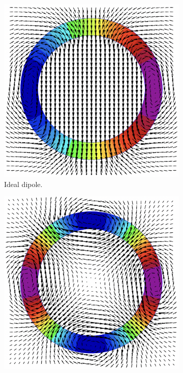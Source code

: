 \begin{figure}[!hbt]
    \begin{center}
    \begin{subfigure}[b]{0.45\textwidth}
        \begin{center}
        \includegraphics[width=\textwidth]{Figures/Beam_Dynamics_Theory/ideal_dipole_cos_theta.png}
        \caption{Ideal dipole.}
        \label{fig:ideal_dipole}
        \end{center}
    \end{subfigure}
    \hfill
    \begin{subfigure}[b]{0.45\textwidth}
        \begin{center}
        \includegraphics[width=\textwidth]{Figures/Beam_Dynamics_Theory/ideal_quadrupole_cos_2theta.png}

\end{center}
\end{subfigure}
\end{center}
\end{figure}
